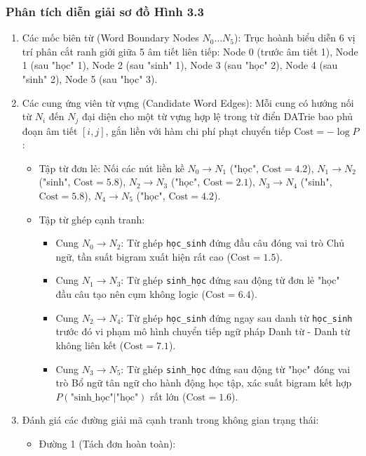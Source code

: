 \documentclass[12pt,a4paper,oneside]{report}
\begin{document}
\subsubsection{Phân tích diễn giải sơ đồ Hình 3.3}
\begin{enumerate}
    \item Các mốc biên từ (Word Boundary Nodes $N_0 \dots N_5$): Trục hoành biểu diễn 6 vị trí phân cắt ranh giới giữa 5 âm tiết liên tiếp: Node 0 (trước âm tiết 1), Node 1 (sau "học" 1), Node 2 (sau "sinh" 1), Node 3 (sau "học" 2), Node 4 (sau "sinh" 2), Node 5 (sau "học" 3).
    \item Các cung ứng viên từ vựng (Candidate Word Edges): Mỗi cung có hướng nối từ $N_i$ đến $N_j$ đại diện cho một từ vựng hợp lệ trong từ điển DATrie bao phủ đoạn âm tiết $[i, j]$, gắn liền với hàm chi phí phạt chuyển tiếp $\text{Cost} = -\log P$:
    \begin{itemize}
        \item Tập từ đơn lẻ: Nối các nút liền kề $N_0 \to N_1$ ("học", $\text{Cost}=4.2$), $N_1 \to N_2$ ("sinh", $\text{Cost}=5.8$), $N_2 \to N_3$ ("học", $\text{Cost}=2.1$), $N_3 \to N_4$ ("sinh", $\text{Cost}=5.8$), $N_4 \to N_5$ ("học", $\text{Cost}=4.2$).
        \item Tập từ ghép cạnh tranh:
        \begin{itemize}
            \item Cung $N_0 \to N_2$: Từ ghép \texttt{học\_sinh} đứng đầu câu đóng vai trò Chủ ngữ, tần suất bigram xuất hiện rất cao ($\text{Cost} = 1.5$).
            \item Cung $N_1 \to N_3$: Từ ghép \texttt{sinh\_học} đứng sau động từ đơn lẻ "học" đầu câu tạo nên cụm không logic ($\text{Cost} = 6.4$).
            \item Cung $N_2 \to N_4$: Từ ghép \texttt{học\_sinh} đứng ngay sau danh từ \texttt{học\_sinh} trước đó vi phạm mô hình chuyển tiếp ngữ pháp Danh từ - Danh từ không liên kết ($\text{Cost} = 7.1$).
            \item Cung $N_3 \to N_5$: Từ ghép \texttt{sinh\_học} đứng sau động từ "học" đóng vai trò Bổ ngữ tân ngữ cho hành động học tập, xác suất bigram kết hợp $P(\text{"sinh\_học"} | \text{"học"})$ rất lớn ($\text{Cost} = 1.6$).
        \end{itemize}
    \end{itemize}
    \item Đánh giá các đường giải mã cạnh tranh trong không gian trạng thái:
    \begin{itemize}
        \item Đường 1 (Tách đơn hoàn toàn):

\end{itemize}
\end{enumerate}
\end{document}
